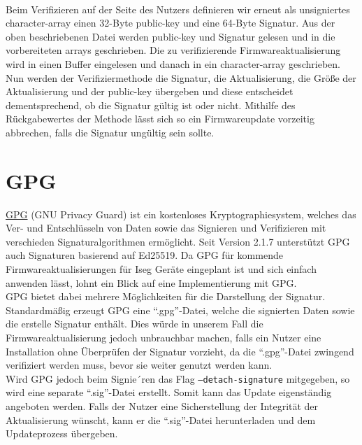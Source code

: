 \documentclass[thesis=bachelor,faculty=cb]{hsmw-thesis}
\begin{document}
{	\\[1cm]
	Beim Verifizieren auf der Seite des Nutzers definieren wir erneut als unsigniertes character-array einen 32-Byte public-key und eine 64-Byte Signatur. Aus der oben beschriebenen Datei werden public-key und Signatur gelesen und in die vorbereiteten arrays geschrieben.
	Die zu verifizierende Firmwareaktualisierung wird in einen Buffer eingelesen und danach in ein character-array geschrieben.
	Nun werden der Verifiziermethode die Signatur, die Aktualisierung, die Größe der Aktualisierung und der public-key übergeben und diese entscheidet dementsprechend, ob die Signatur gültig ist oder nicht. Mithilfe des Rückgabewertes der Methode lässt sich so ein Firmwareupdate vorzeitig abbrechen, falls die Signatur ungültig sein sollte.
	
	
	
	\section{GPG}
	\href{https://www.gnupg.org/}{GPG} (GNU Privacy Guard) ist ein kostenloses Kryptographiesystem, welches das Ver- und Entschlüsseln von Daten sowie das Signieren und Verifizieren mit verschieden Signaturalgorithmen ermöglicht. Seit Version 2.1.7 \cite{GNU217} unterstützt GPG auch Signaturen basierend auf Ed25519. Da GPG für kommende Firmwareaktualisierungen für Iseg Geräte eingeplant ist und sich einfach anwenden lässt, lohnt ein Blick auf eine Implementierung mit GPG. 
	\\[1cm]
	GPG bietet dabei mehrere Möglichkeiten für die Darstellung der Signatur. Standardmäßig erzeugt GPG eine \enquote{.gpg}-Datei, welche die signierten Daten sowie die erstelle Signatur enthält. Dies würde in unserem Fall die Firmwareaktualisierung jedoch unbrauchbar machen, falls ein Nutzer eine Installation ohne Überprüfen der Signatur vorzieht, da die \enquote{.gpg}-Datei zwingend verifiziert werden muss, bevor sie weiter genutzt werden kann.
	\\[1cm]
	Wird GPG jedoch beim Signie´ren das Flag \texttt{--detach-signature} mitgegeben, so wird eine separate \enquote{.sig}-Datei erstellt. Somit kann das Update eigenständig angeboten werden. Falls der Nutzer eine Sicherstellung der Integrität der Aktualisierung wünscht, kann er die \enquote{.sig}-Datei herunterladen und dem Updateprozess übergeben.
}
\end{document}
